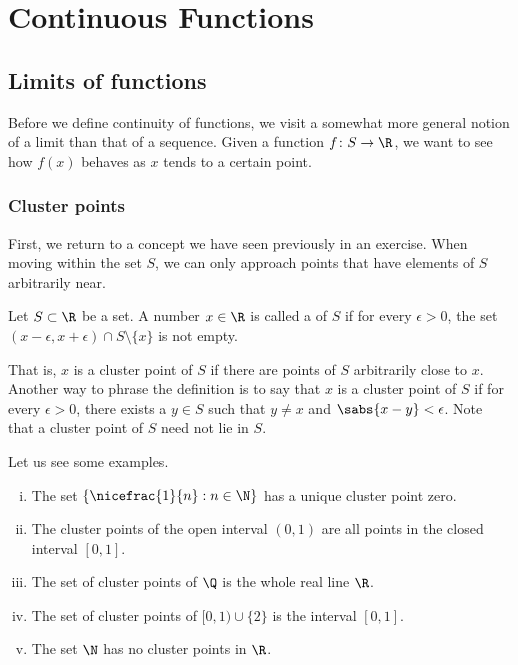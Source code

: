 \chapter{Continuous Functions} \label{lim:chapter}


\section{Limits of functions}
\label{sec:limoffunc}



Before we define continuity of functions, we visit a somewhat
more general notion of a limit than that of a sequence.
Given a function $f \colon S \to
\R$, we want to see how $f(x)$ behaves as $x$ tends to a certain point.

\subsection{Cluster points}

First,
we return to a concept we have seen previously in an exercise.
When moving within the set $S$, we can only approach points
that have elements of $S$ arbitrarily near.

\begin{defn}
Let $S \subset \R$ be a set.  A number $x \in \R$ is called
a \emph{} of $S$
if for every $\epsilon > 0$, the set $(x-\epsilon,x+\epsilon) \cap S
\setminus \{ x \}$ is not empty.
\end{defn}

That is, $x$ is a cluster point of $S$ if there are points of $S$
arbitrarily close to $x$.  Another way to phrase the definition is to say
that $x$ is a cluster point of $S$ if for every $\epsilon > 0$, there
exists a $y \in S$ such that $y \not= x$ and $\sabs{x - y} < \epsilon$.
Note that a cluster point of $S$ need not lie in $S$.

Let us see some examples.
\begin{enumerate}[(i)]
\item The set
$\{ \nicefrac{1}{n} : n \in \N \}$ has a unique cluster point zero.
\item The cluster points of the open interval $(0,1)$ are
all points in the closed interval $[0,1]$.
\item
The set of cluster points of $\Q$ is the whole real line $\R$.
\item 
The set of cluster points of $[0,1) \cup \{ 2 \}$ is the interval $[0,1]$.
\item The set $\N$ has no cluster points in $\R$.
\end{enumerate}

